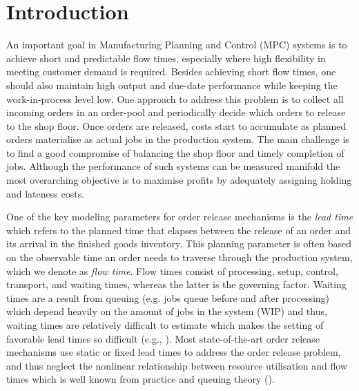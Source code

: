 \documentclass[envcountsame]{llncs}
\begin{document}
\section{Introduction}
\label{sec:introduction} An important goal in Manufacturing Planning and Control (MPC) systems is to
achieve short and predictable flow times, especially where high flexibility in meeting customer
demand is required. Besides achieving short flow times, one should also maintain high output and
due-date performance while keeping the work-in-process level low. One approach to address this
problem is to collect all incoming orders in an order-pool and periodically decide which orders to
release to the shop floor. Once orders are released, costs start to accumulate as planned orders
materialise as actual jobs in the production system. The main challenge is to find a good compromise
of balancing the shop floor and timely completion of jobs. Although the performance of such systems
can be measured manifold the most overarching objective is to maximise profits by adequately
assigning holding and lateness costs.

One of the key modeling parameters for order release mechanisms is the \textit{lead time} which
refers to the planned time that elapses between the release of an order and its arrival in the
finished goods inventory. This planning parameter is often based on the observable time an order
needs to traverse through the production system, which we denote as \textit{flow time}. Flow times
consist of processing, setup, control, transport, and waiting times, whereas the latter is the
governing factor. Waiting times are a result from queuing (e.g. jobs queue before and after
processing) which depend heavily on the amount of jobs in the system (WIP) and thus, waiting times
are relatively difficult to estimate which makes the setting of favorable lead times so difficult
(e.g., \citealt{Tatsiopoulos1983, Wiendahl1995}). Most state-of-the-art order release mechanisms use
static or fixed lead times to address the order release problem, and thus neglect the nonlinear
relationship between resource utilisation and flow times which is well known from practice and
queuing theory (\citealt{Pahl2007}).
\end{document}
